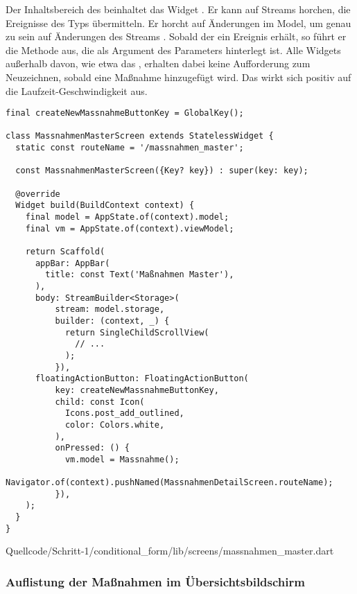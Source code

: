 Der Inhaltsbereich des  beinhaltet das Widget  .
Er kann auf Streams horchen, die Ereignisse des Typs  übermitteln.
Er horcht auf Änderungen im Model, um genau zu sein auf Änderungen des Streams  . Sobald der  ein Ereignis erhält, so führt er die Methode aus, die als Argument des Parameters  hinterlegt ist. Alle Widgets außerhalb davon, wie etwa das , erhalten dabei keine Aufforderung zum Neuzeichnen, sobald eine Maßnahme hinzugefügt wird. Das wirkt sich positiv auf die Laufzeit-Geschwindigkeit aus.


\ifincludeall
  \begin{listing}[htbp]
    \renewcommand\theFancyVerbLine{%
      \ifnum\value{FancyVerbLine}=31
      \setcounter{FancyVerbLine}{85}
      \tiny\ldots
      \else
      \tiny\arabic{FancyVerbLine}%
      \fi
    }
    \begin{verbatim}
final createNewMassnahmeButtonKey = GlobalKey();

class MassnahmenMasterScreen extends StatelessWidget {
  static const routeName = '/massnahmen_master';

  const MassnahmenMasterScreen({Key? key}) : super(key: key);

  @override
  Widget build(BuildContext context) {
    final model = AppState.of(context).model;
    final vm = AppState.of(context).viewModel;

    return Scaffold(
      appBar: AppBar(
        title: const Text('Maßnahmen Master'),
      ),
      body: StreamBuilder<Storage>(
          stream: model.storage,
          builder: (context, _) {
            return SingleChildScrollView(
              // ...
            );
          }),
      floatingActionButton: FloatingActionButton(
          key: createNewMassnahmeButtonKey,
          child: const Icon(
            Icons.post_add_outlined,
            color: Colors.white,
          ),
          onPressed: () {
            vm.model = Massnahme();
            Navigator.of(context).pushNamed(MassnahmenDetailScreen.routeName);
          }),
    );
  }
}
\end{verbatim}
     {Quellcode/Schritt-1/conditional_form/lib/screens/massnahmen_master.dart}
    \label{lst:Schritt1KlasseMassnahmenMasterScreenStruktur}
  \end{listing}
\fi

\clearpage
\subsubsection{Auflistung der Maßnahmen im Übersichtsbildschirm}

